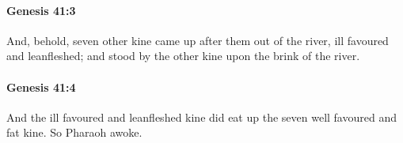 		\paragraph{Genesis 41:3} %
			\label{GENESIS-41-3}

			And, behold, seven other kine came up after them out of the river, ill favoured and leanfleshed; and stood by the other kine upon the brink of the river.


		\paragraph{Genesis 41:4} %
			\label{GENESIS-41-4}

			And the ill favoured and leanfleshed kine did eat up the seven well favoured and fat kine. So Pharaoh awoke.


